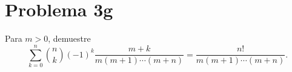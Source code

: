 \section*{Problema 3g}
Para \(m>0\), demuestre
\[\sum_{k=0}^n \binom{n}{k} (-1)^k \frac{m+k}{m(m+1)\cdots(m+n)}
  = \frac{n!}{m(m+1)\cdots(m+n)}.\]
